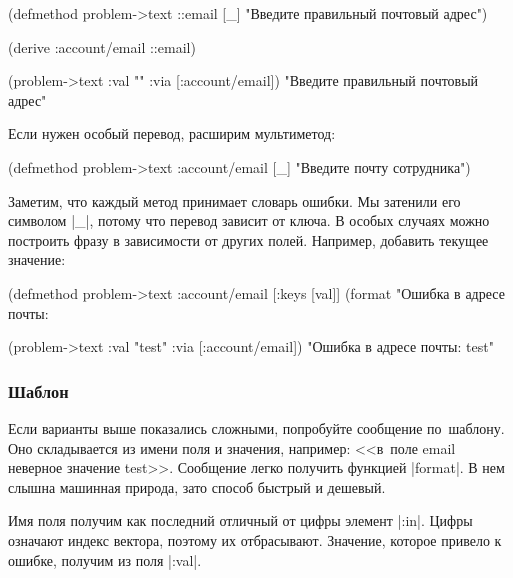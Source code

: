 
  \begin{clojure}
(defmethod problem->text ::email [_]
  "Введите правильный почтовый адрес")

(derive :account/email ::email)

(problem->text {:val "" :via [:account/email]})
"Введите правильный почтовый адрес"
  \end{clojure}

\noindent
Если нужен особый перевод, расширим мультиметод:

  \begin{clojure}
(defmethod problem->text :account/email [_]
  "Введите почту сотрудника")
  \end{clojure}

Заметим, что каждый метод принимает словарь ошибки. Мы затенили его символом
\spverb|_|, потому что перевод зависит от ключа. В особых случаях можно
построить фразу в зависимости от других полей. Например, добавить текущее
значение:

  \begin{clojure}
(defmethod problem->text :account/email
  [{:keys [val]}]
  (format "Ошибка в адресе почты: %

(problem->text {:val "test" :via [:account/email]})
"Ошибка в адресе почты: test"
  \end{clojure}

\subsubsection{Шаблон}


Если варианты выше показались сложными, попробуйте сообщение по~шаблону. Оно
складывается из имени поля и значения, например: <<в~поле email неверное
значение test>>. Сообщение легко получить функцией \spverb|format|. В нем слышна
машинная природа, зато способ быстрый и дешевый.

Имя поля получим как последний отличный от цифры элемент \spverb|:in|. Цифры
означают индекс вектора, поэтому их отбрасывают. Значение, которое привело к
ошибке, получим из поля \spverb|:val|.

